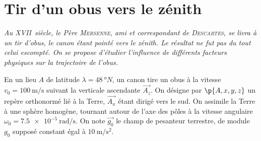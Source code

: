 \documentclass[a4paper,french,bookmarks]{article}
\begin{document}
    \renewcommand{\thesection}{\Roman{section}} 
    \renewcommand{\thesubsection}{\thesection.\Alph{subsection}}
    \renewcommand{\labelenumi}{\thesection.\arabic{enumi}.}
    \renewcommand*{\labelenumii}{\thesection.\arabic{enumi}.\arabic{enumii}.}
    \renewcommand*{\labelenumiii}{\alph{enumiii}.}
    
    
    \section{Tir d'un obus vers le zénith}
    
    \emph{Au \textsc{XVII}\ieme~siècle, le Père {\scshape Mersenne}, ami et
    correspondant de {\scshape Descartes}, se livra à un tir d'obus, le canon
    étant pointé vers le zénith. Le résultat ne fut pas du tout celui escompté.
    On se propose d'étudier l'influence de différents facteurs physiques sur
    la trajectoire de l'obus.}\medskip
        
    En un lieu $A$ de latitude $\lambda = \qty{48}{\degree N}$, un canon
    tire un obus à la vitesse $v_0 = \qty{100}{\metre\per\second}$ suivant la
    verticale ascendante $\vec{A_z}$. On désigne par $\p{A, x, y,
    z}$ un repère orthonormé lié à la Terre, $\vec{A_x}$ étant
    dirigé vers le sud. On assimile la Terre à une sphère homogène, tournant
    autour de l'axe des pôles à la vitesse angulaire $\omega_0 =
    \qty{7.5e-5}{\radian\per\second}$. On note $\vec{g_0}$ le champ de
    pesanteur terrestre, de module $g_0$ supposé constant égal à
    $\qty{10}{\metre\per\second\squared}$.
\end{document}
